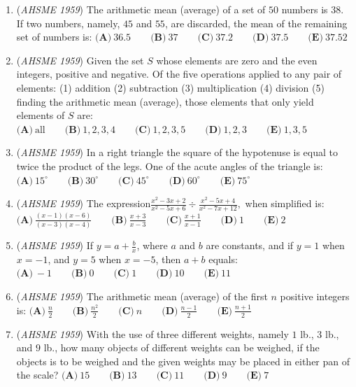 \begin{enumerate}
	\item (\textit{AHSME 1959}) The arithmetic mean (average) of a set of $50$ numbers is $38$. If two numbers, namely, $45$ and $55$, are discarded, the mean of the remaining set of numbers is:
$\textbf{(A)}\ 36.5 \qquad\textbf{(B)}\ 37\qquad\textbf{(C)}\ 37.2\qquad\textbf{(D)}\ 37.5\qquad\textbf{(E)}\ 37.52$


	\item (\textit{AHSME 1959}) Given the set $S$ whose elements are zero and the even integers, positive and negative. 
Of the five operations applied to any pair of elements: (1) addition (2) subtraction 
(3) multiplication (4) division (5) finding the arithmetic mean (average), those elements that only yield elements of $S$ are:
$\textbf{(A)}\ \text{all} \qquad\textbf{(B)}\ 1,2,3,4\qquad\textbf{(C)}\ 1,2,3,5\qquad\textbf{(D)}\ 1,2,3\qquad\textbf{(E)}\ 1,3,5$


	\item (\textit{AHSME 1959}) In a right triangle the square of the hypotenuse is equal to twice the product of the legs. One of the acute angles of the triangle is:
$\textbf{(A)}\ 15^{\circ} \qquad\textbf{(B)}\ 30^{\circ} \qquad\textbf{(C)}\ 45^{\circ} \qquad\textbf{(D)}\ 60^{\circ}\qquad\textbf{(E)}\ 75^{\circ}$


	\item (\textit{AHSME 1959}) The expression$\frac{x^2-3x+2}{x^2-5x+6}\div \frac{x^2-5x+4}{x^2-7x+12},$ when simplified is:
$\textbf{(A)}\ \frac{(x-1)(x-6)}{(x-3)(x-4)} \qquad\textbf{(B)}\ \frac{x+3}{x-3}\qquad\textbf{(C)}\ \frac{x+1}{x-1}\qquad\textbf{(D)}\ 1\qquad\textbf{(E)}\ 2$


	\item (\textit{AHSME 1959}) If $y=a+\frac{b}{x}$, where $a$ and $b$ are constants, and if $y=1$ when $x=-1$, and $y=5$ when $x=-5$, then $a+b$ equals:
$\textbf{(A)}\ -1 \qquad\textbf{(B)}\ 0\qquad\textbf{(C)}\ 1\qquad\textbf{(D)}\ 10\qquad\textbf{(E)}\ 11$


	\item (\textit{AHSME 1959}) The arithmetic mean (average) of the first $n$ positive integers is:
$\textbf{(A)}\ \frac{n}{2} \qquad\textbf{(B)}\ \frac{n^2}{2}\qquad\textbf{(C)}\ n\qquad\textbf{(D)}\ \frac{n-1}{2}\qquad\textbf{(E)}\ \frac{n+1}{2}$


	\item (\textit{AHSME 1959}) With the use of three different weights, namely $1$ lb., $3$ lb., and $9$ lb., how many objects of different weights can be weighed, 
if the objects is to be weighed and the given weights may be placed in either pan of the scale?
$\textbf{(A)}\ 15 \qquad\textbf{(B)}\ 13\qquad\textbf{(C)}\ 11\qquad\textbf{(D)}\ 9\qquad\textbf{(E)}\ 7$



\end{enumerate}
